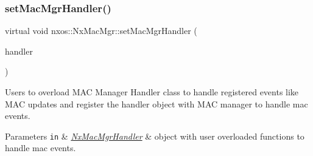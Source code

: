 \subsubsection{\texorpdfstring{set\+Mac\+Mgr\+Handler()}{setMacMgrHandler()}}
{\footnotesize\ttfamily virtual void nxos\+::\+Nx\+Mac\+Mgr\+::set\+Mac\+Mgr\+Handler (\begin{DoxyParamCaption}\item[{\mbox{\hyperlink{classnxos_1_1_nx_mac_mgr_handler}{Nx\+Mac\+Mgr\+Handler}} $\ast$}]{handler }\end{DoxyParamCaption})\hspace{0.3cm}{\ttfamily [pure virtual]}}

Users to overload M\+AC Manager Handler class to handle registered events like M\+AC updates and register the handler object with M\+AC manager to handle mac events. 
\begin{DoxyParams}[1]{Parameters}
\mbox{\tt in}  & {\em \mbox{\hyperlink{classnxos_1_1_nx_mac_mgr_handler}{Nx\+Mac\+Mgr\+Handler}}} & object with user overloaded functions to handle mac events.\\
\hline
\end{DoxyParams}

